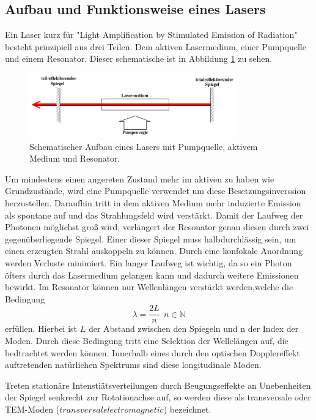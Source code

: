 \subsection{Aufbau und Funktionsweise eines Lasers}
Ein Laser kurz für "Light Amplification by Stimulated Emission of Radiation" besteht prinzipiell aus
drei Teilen. Dem aktiven Lasermedium, einer Pumpquelle und einem Resonator. Dieser
schematische ist in Abbildung \ref{pic:laser} zu sehen.
\begin{figure}[htb]
  \centering
  \includegraphics[width=0.8\textwidth]{content/prinzip_laser.png}
  \caption{Schematischer Aufbau eines Lasers mit Pumpquelle, aktivem Medium und Resonator.}
  \label{pic:laser}
\end{figure}
Um mindestens einen angereten Zustand mehr im aktiven zu haben wie Grundzustände,
wird eine Pumpquelle verwendet um diese Besetzungsinverssion herzustellen.
Daraufhin tritt in dem aktiven Medium mehr induzierte Emission als spontane auf und das
Strahlungsfeld wird verstärkt. Damit der Laufweg der Photonen möglichst groß wird, verlängert
der Resonator genau diesen durch zwei gegenüberliegende Spiegel. Einer dieser Spiegel
muss halbdurchlässig sein, um einen erzeugten Strahl auskoppeln zu können. Durch eine
konfokale Anordnung werden Verluste minimiert.
Ein langer Laufweg ist wichtig, da so ein Photon öfters durch das Lasermedium gelangen kann
und dadurch weitere Emissionen bewirkt.
Im Resonator können nur Wellenlängen verstärkt werden,welche die Bedingung
\begin{equation}
  \lambda = \frac{2L}{n}\ \ n\in\mathds{N}
\end{equation}
erfüllen. Hierbei ist $L$ der Abstand zwischen den Spiegeln und n der Index der Moden.
Durch diese Bedingung tritt eine Selektion der Wellelängen auf, die bedtrachtet werden können.
Innerhalb eines durch den optischen Dopplereffekt auftretenden natürlichen Spektrums
sind diese longitudinale Moden.

Treten stationäre Intenstiätsverteilungen durch Beugungseffekte an Unebenheiten
der Spiegel senkrecht zur Rotationachse auf, so werden diese als transversale oder
TEM-Moden ($transversal electromagnetic$) bezeichnet.


